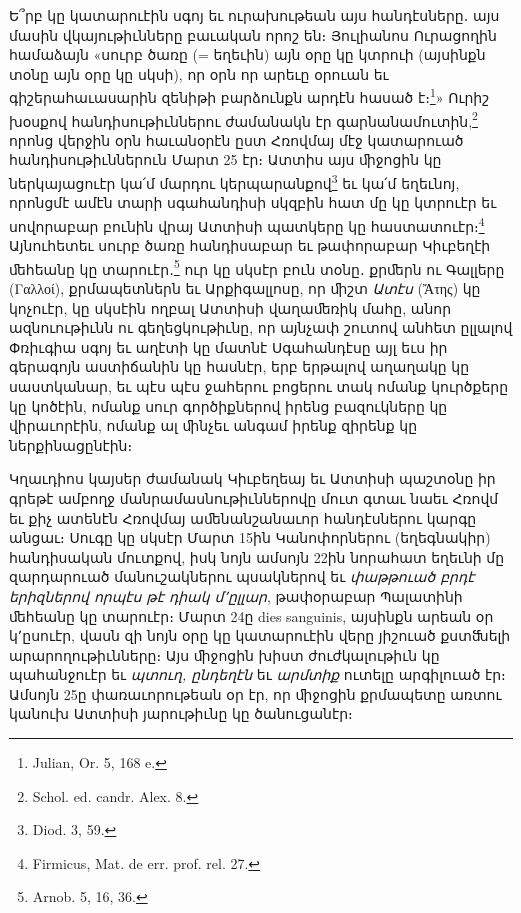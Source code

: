 \documentclass{article}
\begin{document}
{Ե՞րբ կը կատարուէին սգոյ եւ ուրախութեան այս հանդէսները․ այս մասին վկայութիւնները բաւական որոշ են։ Յուլիանոս Ուրացողին համաձայն «սուրբ ծառը (= եղեւին) այն օրը կը կտրուի (այսինքն տօնը այն օրը կը սկսի), որ օրն որ արեւը օրուան եւ գիշերահաւասարին զենիթի բարձունքն արդէն հասած է։\footnote{Julian, Or. 5, 168 e.}» Ուրիշ խօսքով հանդիսութիւններու ժամանակն էր գարնանամուտին,\footnote{Schol. ed. candr. Alex. 8.} որոնց վերջին օրն հաւանօրէն ըստ Հռովմայ մէջ կատարուած հանդիսութիւններուն Մարտ 25 էր։ Ատտիս այս ﬕջոցին կը ներկայացուէր կա՛մ մարդու կերպարանքով\footnote{Diod. 3, 59.} եւ կա՛մ եղեւնոյ, որոնցմէ ամէն տարի սգահանդիսի սկզբին հատ մը կը կտրուէր եւ սովորաբար բունին վրայ Ատտիսի պատկերը կը հաստատուէր։\footnote{Firmicus, Mat. de err. prof. rel. 27.} Այնուհետեւ սուրբ ծառը հանդիսաբար եւ թափորաբար Կիւբեղէի ﬔհեանը կը տարուէր․\footnote{Arnob. 5, 16, 36.} ուր կը սկսէր բուն տօնը․ քրﬔրն ու Գալլերը (Γαλλοί), քրմապետներն եւ Արքիգալլոսը, որ ﬕշտ \emph{Ատէս} (Ἄτης) կը կոչուէր, կը սկսէին ողբալ Ատտիսի վաղաﬔռիկ մահը, անոր ազնուութիւնն ու գեղեցկութիւնը, որ այնչափ շուտով անհետ ըլլալով Փռիւգիա սգոյ եւ աղէտի կը մատնէ Սգահանդէսը այլ եւս իր գերագոյն աստիճանին կը հասնէր, երբ երթալով աղաղակը կը սաստկանար, եւ պէս պէս ջահերու բոցերու տակ ոմանք կուրծքերը կը կոծէին, ոմանք սուր գործիքներով իրենց բազուկները կը վիրաւորէին, ոմանք ալ ﬕնչեւ անգամ իրենք զիրենք կը ներքինացընէին։

Կղաւդիոս կայսեր ժամանակ Կիւբեղեայ եւ Ատտիսի պաշտօնը իր գրեթէ ամբողջ մանրամասնութիւններովը մուտ գտաւ նաեւ Հռովմ եւ քիչ ատենէն Հռովմայ աﬔնանշանաւոր հանդէսներու կարգը անցաւ։ Սուգը կը սկսէր Մարտ 15ին Կանոփորներու (եղեգնակիր) հանդիսական մուտքով, իսկ նոյն ամսոյն 22ին նորահատ եղեւնի մը զարդարուած մանուշակներու պսակներով եւ \emph{փաթթուած բրդէ երիզներով որպէս թէ դիակ մ՚ըլլար}, թափօրաբար Պալատինի ﬔհեանը կը տարուէր։ Մարտ 24ը dies sanguinis, այսինքն արեան օր կ՚ըսուէր, վասն զի նոյն օրը կը կատարուէին վերը յիշուած քստﬓելի արարողութիւնները։ Այս ﬕջոցին խիստ ժուժկալութիւն կը պահանջուէր եւ \emph{պտուղ, ընդեղէն} եւ \emph{արմտիք} ուտելը արգիլուած էր։ Ամսոյն 25ը փառաւորութեան օր էր, որ ﬕջոցին քրմապետը առտու կանուխ Ատտիսի յարութիւնը կը ծանուցանէր։

}
\end{document}
